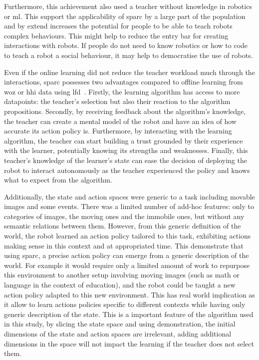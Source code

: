 Furthermore, this achievement also used a teacher without knowledge in robotics or \gls{ml}. This support the applicability of \gls{sparc} by a large part of the population and by extend increases the potential for people to be able to teach robots complex behaviours. This might help to reduce the entry bar for creating interactions with robots. If people do not need to know robotics or how to code to teach a robot a social behaviour, it may help to democratise the use of robots. 

Even if the online learning did not reduce the teacher workload much through the interactions, \gls{sparc} possesses two advantages compared to offline learning from \gls{woz} or \gls{hhi} data using \gls{lfd}~\citep{sequeira2016discovering,liu2014train}. Firstly, the learning algorithm has access to more datapoints: the teacher's selection but also their reaction to the algorithm propositions. Secondly, by receiving feedback about the algorithm's knowledge, the teacher can create a mental model of the robot and have an idea of how accurate its action policy is. Furthermore, by interacting with the learning algorithm, the teacher can start building a trust grounded by their experience with the learner, potentially knowing its strengths and weaknesses. Finally, this teacher's knowledge of the learner's state can ease the decision of deploying the robot to interact autonomously as the teacher experienced the policy and knows what to expect from the algorithm.

Additionally, the state and action spaces were generic to a task including movable images and some events. There was a limited number of add-hoc features: only to categories of images, the moving ones and the immobile ones, but without any semantic relations between them. However, from this generic definition of the world, the robot learned an action policy tailored to this task, exhibiting actions making sense in this context and at appropriated time. This demonstrate that using \gls{sparc}, a precise action policy can emerge from a generic description of the world. For example it would require only a limited amount of work to repurpose this environment to another setup involving moving images (such as math or language in the context of education), and the robot could be taught a new action policy adapted to this new environment. This has real world implication as it allow to learn actions policies specific to different contexts while having only generic description of the state. This is a important feature of the algorithm used in this study, by slicing the state space and using demonstration, the initial dimensions of the state and action spaces are irrelevant, adding additional dimensions in the space will not impact the learning if the teacher does not select them. 

